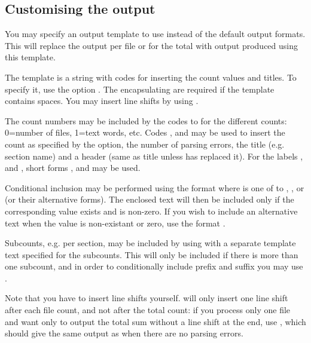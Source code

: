 \documentclass{article}
\begin{document}
\subsection{Customising the output}

You may specify an output template to use instead of the default output formats. This will replace the output per file or for the total with output produced using this template.

The template is a string with codes for inserting the count values and titles. To specify it, use the option . The encapsulating  are required if the template contains spaces. You may insert line shifts by using .

The count numbers may be included by the codes  to  for the different counts: 0=number of files, 1=text words, etc. Codes ,  and  may be used to insert the count as specified by the  option, the number of parsing errors, the title (e.g. section name) and a header (same as title unless \TeXcount{} has replaced it). For the labels ,  and , short forms ,  and  may be used.

Conditional inclusion may be performed using the format  where  is one of  to , ,  or  (or their alternative forms). The enclosed text will then be included only if the corresponding value exists and is non-zero. If you wish to include an alternative text when the value is non-existant or zero, use the format .

Subcounts, e.g. per section, may be included by using  with a separate template text specified for the subcounts. This will only be included if there is more than one subcount, and in order to conditionally include prefix and suffix you may use .

Note that you have to insert line shifts yourself. \TeXcount{} will only insert one line shift after each file count, and not after the total count: if you process only one file and want only to output the total sum without a line shift at the end, use , which should give the same output as  when there are no parsing errors.
\end{document}
